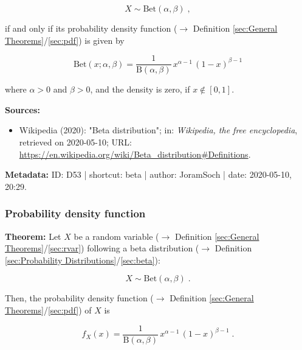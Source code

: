 \documentclass[a4paper,12pt,twoside]{book}
\begin{document}
\begin{equation} \label{eq:beta-beta}
X \sim \mathrm{Bet}(\alpha, \beta) \; ,
\end{equation}

if and only if its probability density function ($\rightarrow$ Definition \ref{sec:General Theorems}/\ref{sec:pdf}) is given by

\begin{equation} \label{eq:beta-beta-pdf}
\mathrm{Bet}(x; \alpha, \beta) = \frac{1}{\mathrm{B}(\alpha, \beta)} \, x^{\alpha-1} \, (1-x)^{\beta-1}
\end{equation}

where $\alpha > 0$ and $\beta > 0$, and the density is zero, if $x \notin [0,1]$.


\vspace{1em}
\textbf{Sources:}
\begin{itemize}
\item Wikipedia (2020): "Beta distribution"; in: \textit{Wikipedia, the free encyclopedia}, retrieved on 2020-05-10; URL: \url{https://en.wikipedia.org/wiki/Beta_distribution#Definitions}.
\end{itemize}


\vspace{1em}
\textbf{Metadata:} ID: D53 | shortcut: beta | author: JoramSoch | date: 2020-05-10, 20:29.
\vspace{1em}



\subsubsection[\textbf{Probability density function}]{Probability density function} \label{sec:beta-pdf}
\setcounter{equation}{0}

\textbf{Theorem:} Let $X$ be a random variable ($\rightarrow$ Definition \ref{sec:General Theorems}/\ref{sec:rvar}) following a beta distribution ($\rightarrow$ Definition \ref{sec:Probability Distributions}/\ref{sec:beta}):

\begin{equation} \label{eq:beta-pdf-beta}
X \sim \mathrm{Bet}(\alpha, \beta) \; .
\end{equation}

Then, the probability density function ($\rightarrow$ Definition \ref{sec:General Theorems}/\ref{sec:pdf}) of $X$ is

\begin{equation} \label{eq:beta-pdf-beta-pdf}
f_X(x) = \frac{1}{\mathrm{B}(\alpha, \beta)} \, x^{\alpha-1} \, (1-x)^{\beta-1} \; .
\end{equation}
\end{document}

